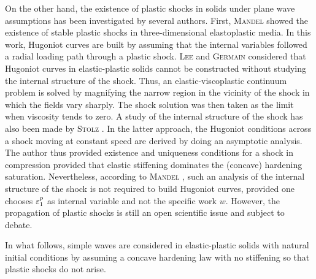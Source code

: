 On the other hand, the existence of plastic shocks in solids under plane wave assumptions has been investigated by several authors. %
First, \textsc{Mandel} \cite{Mandel1} showed the existence of stable plastic shocks in three-dimensional elastoplastic media.
In this work, Hugoniot curves are built by assuming that the internal variables followed a radial loading path through a plastic shock.
\textsc{Lee} and \textsc{Germain} \cite{Germain_shock} considered that Hugoniot curves in elastic-plastic solids cannot be constructed without studying the internal structure of the shock.
Thus, an elastic-viscoplastic continuum problem is solved by magnifying the narrow region in the vicinity of the shock in which the fields vary sharply.
The shock solution was then taken as the limit when viscosity tends to zero.
A study of the internal structure of the shock has also been made by \textsc{Stolz} \cite{Claude}.
In the latter approach, the Hugoniot conditions across a shock moving at constant speed are derived by doing an asymptotic analysis. %
The author thus provided existence and uniqueness conditions for a shock in compression provided that elastic stiffening dominates the (concave) hardening saturation.
Nevertheless, according to \textsc{Mandel} \cite{Mandel2}, such an analysis of the internal structure of the shock is not required to build Hugoniot curves, provided one chooses $\varepsilon^p_1$ as internal variable and not the specific work $w$.
However, the propagation of plastic shocks is still an open scientific issue and subject to debate.

In what follows, simple waves are considered in elastic-plastic solids with natural initial conditions by assuming a concave hardening law with no stiffening so that plastic shocks do not arise.






